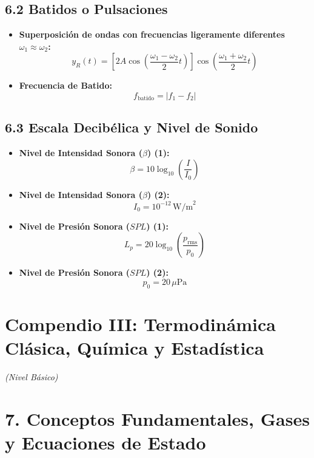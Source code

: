 \documentclass[11pt,a4paper]{article}
\begin{document}
\subsection*{6.2 Batidos o Pulsaciones}

\begin{itemize}
  \item \textbf{Superposición de ondas con frecuencias ligeramente diferentes $\omega_1 \approx \omega_2$:}
  \[
    y_R(t) = \left[ 2A \cos\left( \frac{\omega_1 - \omega_2}{2} t \right) \right] \cos\left( \frac{\omega_1 + \omega_2}{2} t \right)
  \]
  \item \textbf{Frecuencia de Batido:}
  \[
    f_{\text{batido}} = |f_1 - f_2|
  \]
\end{itemize}

\subsection*{6.3 Escala Decibélica y Nivel de Sonido}

\begin{itemize}
  \item \textbf{Nivel de Intensidad Sonora ($\beta$) (1):}
  \[
    \beta = 10 \log_{10}\left( \frac{I}{I_0} \right)
  \]
  \item \textbf{Nivel de Intensidad Sonora ($\beta$) (2):}
  \[
    I_0 = 10^{-12} \, \mathrm{W/m}^2
  \]
  \item \textbf{Nivel de Presión Sonora ($SPL$) (1):}
  \[
    L_p = 20 \log_{10}\left( \frac{p_{\mathrm{rms}}}{p_0} \right)
  \]
  \item \textbf{Nivel de Presión Sonora ($SPL$) (2):}
  \[
    p_0 = 20 \, \mu\mathrm{Pa}
  \]
\end{itemize}

\section*{Compendio III: Termodinámica Clásica, Química y Estadística}

\textit{(Nivel Básico)}

\section*{7. Conceptos Fundamentales, Gases y Ecuaciones de Estado}
\end{document}
